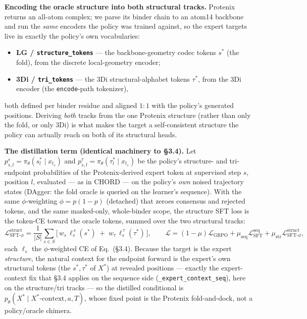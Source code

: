 \documentclass[11pt]{article}
\newcommand{\ttk}[1]{\texttt{\small #1}}
\begin{document}
\textbf{Encoding the oracle structure into both structural tracks.} Protenix returns an all-atom
complex; we parse its binder chain to an atom14 backbone and run the \emph{same} encoders the policy
was trained against, so the expert targets live in exactly the policy's own vocabularies:
\begin{itemize}
\item \textbf{LG / \ttk{structure\_tokens}} --- the backbone-geometry codec tokens $s^{\ast}$ (the
  fold), from the discrete local-geometry encoder;
\item \textbf{3Di / \ttk{tri\_tokens}} --- the 3Di structural-alphabet tokens $\tau^{\ast}$, from the
  3Di encoder (the \ttk{encode}-path tokenizer),
\end{itemize}
both defined per binder residue and aligned $1{:}1$ with the policy's generated positions. Deriving
\emph{both} tracks from the one Protenix structure (rather than only the fold, or only 3Di) is what
makes the target a self-consistent structure the policy can actually reach on both of its structural
heads.

\textbf{The distillation term (identical machinery to \S3.4).} Let $p^{s}_{s,l}=\pi_\theta(s^{\ast}_l
\!\mid\!x_{t_s})$ and $p^{\tau}_{s,l}=\pi_\theta(\tau^{\ast}_l\!\mid\!x_{t_s})$ be the policy's
structure- and tri-endpoint probabilities of the Protenix-derived expert token at supervised step
$s$, position $l$, evaluated --- as in CHORD --- on the policy's \emph{own} noised trajectory states
(DAgger: the fold oracle is queried on the learner's sequence). With the same $\phi$-weighting
$\phi=p(1-p)$ (detached) that zeroes consensus and rejected tokens, and the same masked-only,
whole-binder scope, the structure SFT loss is the token-CE toward the oracle tokens, summed over the
two structural tracks:
\[
\mathcal L_{\text{SFT-}\phi}^{\text{struct}}
   =\frac1{|S|}\sum_{s\in S}
     \Big[\,w_s\,\ell^{\,s}_s(s^{\ast})\;+\;w_\tau\,\ell^{\,\tau}_s(\tau^{\ast})\,\Big],
\qquad
\mathcal L=(1-\mu)\mathcal L_{\mathrm{GRPO}}+\mu_{\text{seq}}\mathcal L_{\text{SFT}}^{\text{seq}}
   +\mu_{\text{str}}\mathcal L_{\text{SFT-}\phi}^{\text{struct}},
\]
each $\ell_s$ the $\phi$-weighted CE of Eq.\ (\S3.4). Because the target is the expert
\emph{structure}, the natural context for the endpoint forward is the expert's own structural tokens
(the $s^{\ast},\tau^{\ast}$ of $X^{\ast}$) at revealed positions --- exactly the expert-context fix
that \S3.4 applies on the sequence side (\ttk{\_expert\_context\_seq}), here on the structure/tri
tracks --- so the distilled conditional is $p_\theta(X^{\ast}\!\mid\!X^{\ast}\text{-context},a,T)$,
whose fixed point is the Protenix fold-and-dock, not a policy/oracle chimera.
\end{document}
